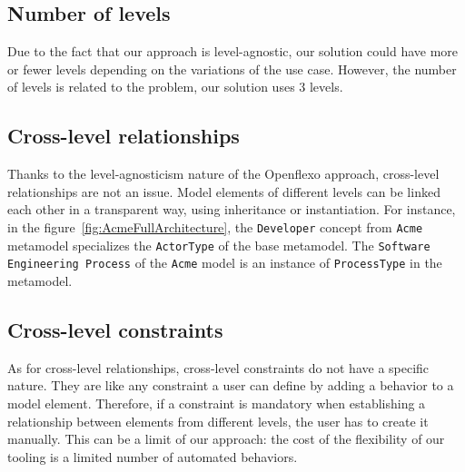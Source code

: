 
  \subsection{Number of levels}

  Due to the fact that our approach is level-agnostic, our solution could have
  more or fewer levels depending on the variations of the use case. However,
  the number of levels is related to the problem, our solution uses 3 levels.

  \subsection{Cross-level relationships}


  Thanks to the level-agnosticism nature of the Openflexo approach, cross-level
  relationships are not an issue. Model elements of different levels can be
  linked each other in a transparent way, using inheritance or instantiation.
  For instance, in the figure~\ref{fig:AcmeFullArchitecture}, the
  \texttt{Developer} concept from \texttt{Acme} metamodel specializes the
  \texttt{ActorType} of the base metamodel. The \texttt{Software Engineering Process} of the
  \texttt{Acme} model is an instance of \texttt{ProcessType} in the metamodel.


  \subsection{Cross-level constraints}


  As for cross-level relationships, cross-level constraints do not have a
  specific nature. They are like any constraint a user can define by adding a
  behavior to a model element. Therefore, if a constraint is mandatory when
  establishing a relationship between elements from different levels, the user
  has to create it manually. This can be a limit of our approach: the cost of
  the flexibility of our tooling is a limited number of automated behaviors.

